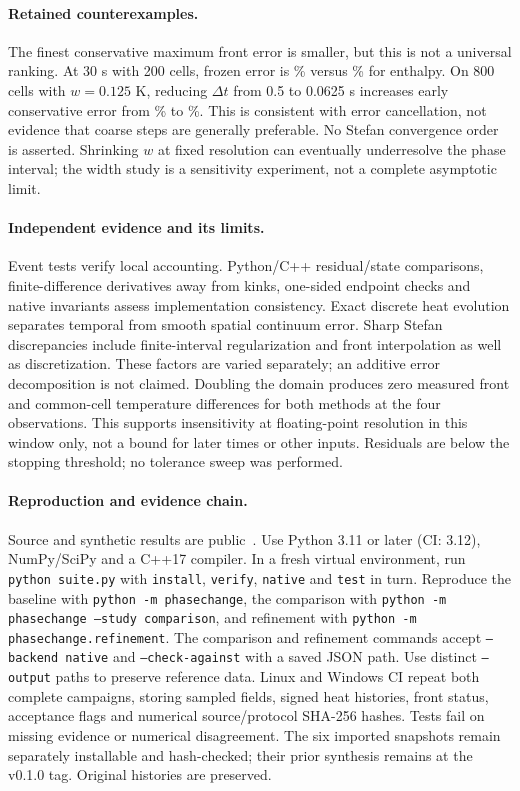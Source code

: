 \documentclass[10pt,a4paper]{article}
\begin{document}
\paragraph{Retained counterexamples.}
The finest conservative maximum front error is smaller, but this is not a
universal ranking. At 30 s with 200 cells, frozen error is
\FrozenMeshOneEarly\% versus \ConservativeMeshOneEarly\% for enthalpy.
On 800 cells with $w=0.125$ K, reducing $\Delta t$ from 0.5 to 0.0625 s
increases early conservative error from \CoarseTimeEarly\% to \FineTimeEarly\%.
This is consistent with error cancellation, not evidence that coarse steps
are generally preferable. No Stefan convergence order is asserted.
Shrinking $w$ at fixed resolution can eventually underresolve the phase
interval; the width study is a sensitivity experiment, not a complete
asymptotic limit.

\paragraph{Independent evidence and its limits.}
Event tests verify local accounting. Python/C++ residual/state comparisons,
finite-difference derivatives away from kinks, one-sided endpoint checks
and native invariants assess implementation consistency. Exact discrete
heat evolution separates temporal from smooth spatial continuum error.
Sharp Stefan discrepancies include finite-interval regularization and front
interpolation as well as discretization. These factors are varied separately;
an additive error decomposition is not claimed. Doubling the domain produces
zero measured front and common-cell temperature differences for both methods
at the four observations. This supports insensitivity at floating-point
resolution in this window only, not a bound for later times or other inputs.
Residuals are below the stopping threshold; no tolerance sweep was performed.

\paragraph{Reproduction and evidence chain.}
\begin{sloppypar}
Source and synthetic results are public~\cite{code}. Use Python 3.11 or later
(CI: 3.12), NumPy/SciPy and a C++17 compiler. In a fresh virtual environment,
run \texttt{python suite.py} with \texttt{install}, \texttt{verify},
\texttt{native} and \texttt{test} in turn. Reproduce the baseline with
\texttt{python -m phasechange}, the comparison with
\texttt{python -m phasechange --study comparison}, and refinement with
\texttt{python -m phasechange.refinement}.
The comparison and refinement commands accept \texttt{--backend native} and
\texttt{--check-against} with a saved JSON path. Use distinct \texttt{--output}
paths to preserve reference data. Linux and Windows CI repeat both complete
campaigns, storing sampled fields, signed heat histories, front status,
acceptance flags and numerical source/protocol SHA-256 hashes. Tests fail on
missing evidence or numerical disagreement. The six imported snapshots remain
separately installable and hash-checked; their prior synthesis remains at the
v0.1.0 tag. Original histories are preserved.
\end{sloppypar}
\end{document}
